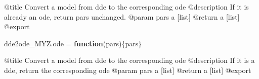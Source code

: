 \documentclass[
]{article}
\newenvironment{Shaded}{\begin{snugshade}}{\end{snugshade}}
\newcommand{\AttributeTok}[1]{\textcolor[rgb]{0.13,0.29,0.53}{#1}}
\newcommand{\ControlFlowTok}[1]{\textcolor[rgb]{0.13,0.29,0.53}{\textbf{#1}}}
\newcommand{\FunctionTok}[1]{\textcolor[rgb]{0.13,0.29,0.53}{\textbf{#1}}}
\newcommand{\NormalTok}[1]{#1}
\newcommand{\OtherTok}[1]{\textcolor[rgb]{0.56,0.35,0.01}{#1}}
\newcommand{\SpecialCharTok}[1]{\textcolor[rgb]{0.81,0.36,0.00}{\textbf{#1}}}
\newcommand{\StringTok}[1]{\textcolor[rgb]{0.31,0.60,0.02}{#1}}
\begin{document}
\begin{Shaded}
\end{Shaded}

@title Convert a model from dde to the corresponding ode @description If
it is already an ode, return pars unchanged. @param pars a {[}list{]}
@return a {[}list{]} @export

\begin{Shaded}
\begin{Highlighting}[]
\NormalTok{dde2ode\_MYZ.ode }\OtherTok{=} \ControlFlowTok{function}\NormalTok{(pars)\{pars\}}
\end{Highlighting}
\end{Shaded}

@title Convert a model from dde to the corresponding ode @description If
it is a dde, return the corresponding ode @param pars a {[}list{]}
@return a {[}list{]} @export

\begin{Shaded}
\end{Shaded}
\end{document}
